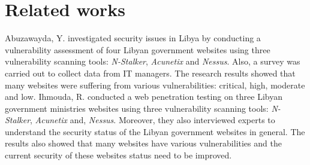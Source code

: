 \documentclass[conference]{IEEEtran}
\begin{document}
%



\section{Related works}

Abuzawayda, Y.\cite{IJIR3439} investigated security issues in Libya by
conducting a vulnerability assessment of four Libyan government
websites using three vulnerability scanning tools: \emph{N-Stalker},
\emph{Acunetix} and \emph{Nessus}. Also, a survey was carried out to
collect data from IT managers. The research results showed that many
websites were suffering from various vulnerabilities: critical, high,
moderate and low. Ihmouda, R.\cite{ihmouda2013penetration} conducted a web penetration testing on three Libyan government ministries websites using three vulnerability scanning
tools: \emph{N-Stalker}, \emph{Acunetix} and, \emph{Nessus}.  Moreover, they
also interviewed experts to understand the security status of the Libyan
government websites in general. The results also showed that many websites have
various vulnerabilities and the current security of these websites status need
to be improved.
\end{document}
